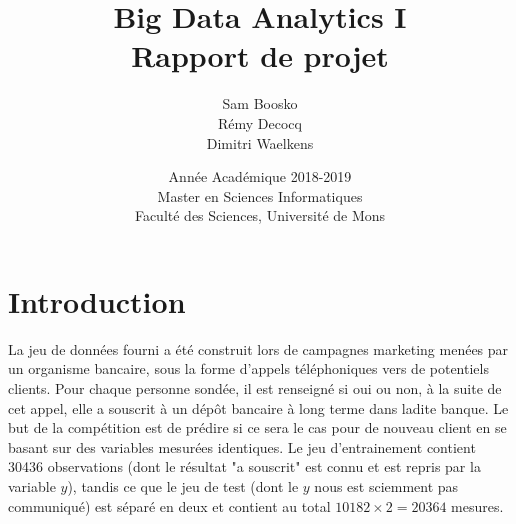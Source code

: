 \documentclass[]{article}
\begin{document}
\title{
\vspace{1.6cm}
{\Huge Big Data Analytics I}\\
\vspace{0.5cm}
{\Huge Rapport de projet}\\
}
\bigskip


\author{
\Large{Sam Boosko}\\
\Large{Rémy Decocq}\\
\Large{Dimitri Waelkens}
}

\date{
\vspace{9.5cm}
Année Académique 2018-2019\\
Master en Sciences Informatiques\\
Faculté des Sciences, Université de Mons}

\maketitle          

\thispagestyle{empty}   

\newpage

\section{Introduction}

La jeu de données fourni a été construit lors de campagnes marketing menées par un organisme bancaire, sous la forme d'appels téléphoniques vers de potentiels clients. Pour chaque personne sondée, il est renseigné si oui ou non, à la suite de cet appel, elle a souscrit à un dépôt bancaire à long terme dans ladite banque. Le but de la compétition est de prédire si ce sera le cas pour de nouveau client en se basant sur des variables mesurées identiques. Le jeu d'entrainement contient 30436 observations (dont le résultat "a souscrit" est connu et est repris par la variable $y$), tandis ce que le jeu de test (dont le $y$ nous est sciemment pas communiqué) est séparé en deux et contient au total $10182 \times 2 = 20364$ mesures.\\
\end{document}
